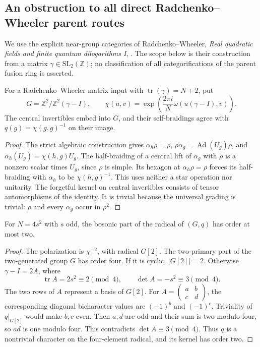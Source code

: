 \subsection{An obstruction to all direct Radchenko--Wheeler parent routes}
\label{subsec:focus-r3472-rw}

We use the explicit near-group categories of Radchenko--Wheeler,
\emph{Real quadratic fields and finite quantum dilogarithms I},
\cite[Sections~4.3 and~5.4]{RWQuadraticFocus}. The scope below is their
construction from a matrix $\gamma\in\mathrm{SL}_2(\mathbb Z)$;
no classification of all categorifications of the parent fusion ring
is asserted.

\begin{lemma}\label{lem:focus-rw-halfbraiding}
For a Radchenko--Wheeler matrix input with
$\operatorname{tr}(\gamma)=N+2$, put
\[
 G=\mathbb Z^2/\mathbb Z^2(\gamma-I),\qquad
 \chi(u,v)=\exp\!\left(\frac{2\pi i}{N}
                  \omega(u(\gamma-I),v)\right).
\]
The central invertibles embed into $G$, and their self-braidings agree
with $q(g)=\chi(g,g)^{-1}$ on their image.
\end{lemma}
\begin{proof}
The strict algebraic construction gives
$\alpha_h\rho=\rho$,
$\rho\alpha_g=\operatorname{Ad}(U_g)\rho$, and
$\alpha_h(U_g)=\chi(h,g)U_g$.
The half-braiding of a central lift of $\alpha_g$ with $\rho$ is a
nonzero scalar times $U_g$, since $\rho$ is simple. Its hexagon at
$\alpha_h\rho=\rho$ forces its half-braiding with $\alpha_h$ to be
$\chi(h,g)^{-1}$. This uses neither a star operation nor unitarity.
The forgetful kernel on central invertibles consists of tensor
automorphisms of the identity. It is trivial because the universal
grading is trivial: $\rho$ and every $\alpha_g$ occur in $\rho^2$.
\end{proof}

\begin{lemma}\label{lem:focus-rw-odd-square}
For $N=4s^2$ with $s$ odd, the bosonic part of the radical of
$(G,q)$ has order at most two.
\end{lemma}
\begin{proof}
The polarization is $\chi^{-2}$, with radical $G[2]$.
The two-primary part of the two-generated group $G$ has order four.
If it is cyclic, $|G[2]|=2$. Otherwise
$\gamma-I=2A$, where
\[
 \operatorname{tr}A=2s^2\equiv2\pmod4,\qquad
 \det A=-s^2\equiv3\pmod4.
\]
The two rows of $A$ represent a basis of $G[2]$. For
$A=\left(\begin{smallmatrix}a&b\\c&d\end{smallmatrix}\right)$,
the corresponding diagonal bicharacter values are $(-1)^b$ and
$(-1)^c$. Triviality of $q|_{G[2]}$ would make $b,c$ even.
Then $a,d$ are odd and their sum is two modulo four, so $ad$ is one
modulo four. This contradicts $\det A\equiv3\pmod4$.
Thus $q$ is a nontrivial character on the four-element radical,
and its kernel has order two.
\end{proof}

